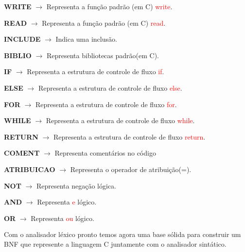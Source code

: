 \documentclass[12pt,a4paper]{report}
\begin{document}
    \hspace{3cm}
    \textbf{WRITE} $\rightarrow$ Representa a função padrão (em C) \textcolor{red}{write}.

    \hspace{3cm}
    \textbf{READ} $\rightarrow$ Representa a função padrão (em C) \textcolor{red}{read}.

    \hspace{3cm}
    \textbf{INCLUDE} $\rightarrow$ Indica uma inclusão.

    \hspace{3cm}
    \textbf{BIBLIO} $\rightarrow$ Representa bibliotecas padrão(em C).
    
    \hspace{3cm}
    \textbf{IF} $\rightarrow$ Representa a estrutura de controle de fluxo \textcolor{red}{if}.

    \hspace{3cm}
    \textbf{ELSE} $\rightarrow$ Representa a estrutura de controle de fluxo \textcolor{red}{else}.

    \hspace{3cm}
    \textbf{FOR} $\rightarrow$ Representa a estrutura de controle de fluxo \textcolor{red}{for}.

    \hspace{3cm}
    \textbf{WHILE} $\rightarrow$ Representa a estrutura de controle de fluxo \textcolor{red}{while}.

    \hspace{3cm}
    \textbf{RETURN} $\rightarrow$ Representa a estrutura de controle de fluxo \textcolor{red}{return}. 

    \hspace{3cm}
    \textbf{COMENT} $\rightarrow$ Representa comentários no código

    \hspace{3cm}
    \textbf{ATRIBUICAO} $\rightarrow$ Representa o operador de atribuição(=).
    
    \hspace{3cm}
    \textbf{NOT} $\rightarrow$ Representa negação lógica. 

    \hspace{3cm}
    \textbf{AND} $\rightarrow$ Representa \textcolor{red}{e} lógico.

    \hspace{3cm}
    \textbf{OR} $\rightarrow$ Representa \textcolor{red}{ou} lógico.

    Com o analisador léxico pronto temos agora uma base sólida para construir um BNF que represente a linguagem C juntamente com o analisador sintático.
\end{document}
